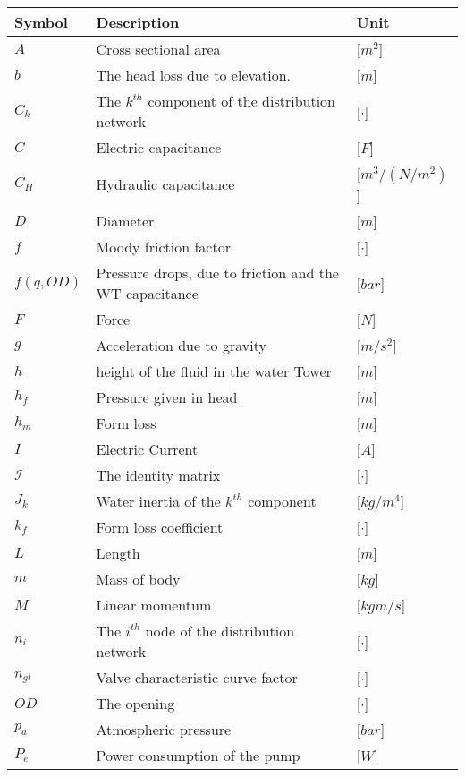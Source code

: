 \begin{tabular}{l l l} 
	\textbf{Symbol}		&	\textbf{Description}										& \textbf{Unit}	\\\hline
	$A$					&	Cross sectional area									    & [$m^2$]\\
	$b$					&	The head loss due to elevation. 						    & [$m$]\\
	$C_k$				&	The $k^{th}$ component of the distribution network     		& [$\cdot$]\\
	$C$					&	Electric capacitance								   		& [$F$]\\
	$C_H$				&	Hydraulic capacitance								   		& [$m^3/(N/m^2)$]\\
	$D$					&	Diameter									     			& [$m$]\\
	$f$					&	Moody friction factor									    & [$\cdot$]\\
	$f(q,OD)$			&	Pressure drops, due to friction and the WT capacitance		& [$bar$]\\
	$F$					&	Force									     				& [$N$]\\
	$g$					&	Acceleration due to gravity									& [$m/s^2$]\\
	$h$					&	height of the fluid in the water Tower						& [$m$]\\
	$h_f$				&	Pressure given in head									    & [$m$]\\
	$h_m$				&	Form loss									    			& [$m$]\\
	$I$					&	Electric Current 											& [$A$]\\
	$\bm{\mathcal{I}}$  &	The identity matrix 										& [$\cdot$]\\
	$J_k$				&	Water inertia of the $k^{th}$ component						& [$kg/m^4$]\\
	$k_f$				&	Form loss coefficient								    	& [$\cdot$]\\
	$L$					&	Length									     				& [$m$]\\
	$m$					&	Mass of body									     		& [$kg$]\\
	$M$					&	Linear momentum									     		& [$kgm/s$]\\
	$n_i$				&	The $i^{th}$ node of the distribution network     			& [$\cdot$]\\
	$n_{gl}$			&	Valve characteristic curve factor							& [$\cdot$]\\
	$OD$				&	The opening 							& [$\cdot$]\\	
	$p_a$				&	Atmospheric pressure							      		& [$bar$]\\
	$P_e$				&	Power consumption of the pump					      		& [$W$]\\

\end{tabular}
